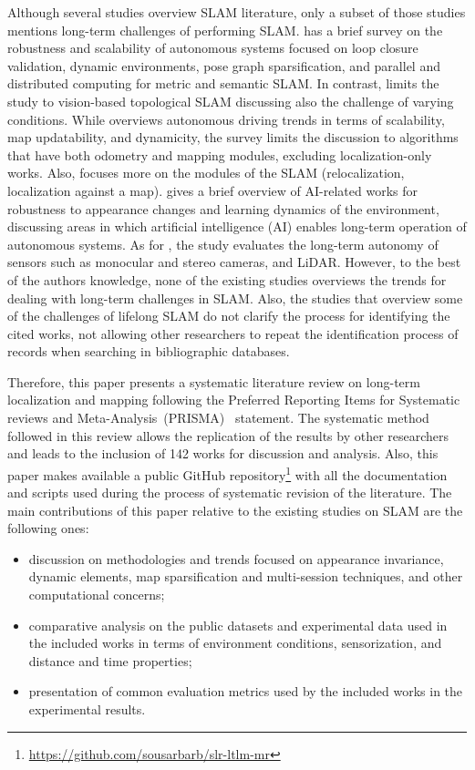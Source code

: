 Although several studies overview SLAM literature, only a subset of those studies mentions long-term challenges of performing SLAM.
\cite{purpose:study:cadena:2016} has a brief survey on the robustness and scalability of autonomous systems focused on loop closure validation, dynamic environments, pose graph sparsification, and parallel and distributed computing for metric and semantic SLAM.
In contrast, \cite{purpose:study:lowry:2016} limits the study to vision-based topological SLAM discussing also the challenge of varying conditions.
While \cite{purpose:study:bresson:2017} overviews autonomous driving trends in terms of scalability, map updatability, and dynamicity, the survey limits the discussion to algorithms that have both odometry and mapping modules, excluding localization-only works. Also, \cite{purpose:study:bresson:2017} focuses more on the modules of the SLAM (relocalization, localization against a map).
\cite{purpose:study:kunze:2018} gives a brief overview of AI-related works for robustness to appearance changes and learning dynamics of the environment, discussing areas in which artificial intelligence (AI) enables long-term operation of autonomous systems.
As for \cite{purpose:study:zaffar:2018}, the study evaluates the long-term autonomy of sensors such as monocular and stereo cameras, and LiDAR.
However, to the best of the authors knowledge, none of the existing studies overviews the trends for dealing with long-term challenges in SLAM. Also, the studies that overview some of the challenges of lifelong SLAM do not clarify the process for identifying the cited works, not allowing other researchers to repeat the identification process of records when searching in bibliographic databases.

Therefore, this paper presents a systematic literature review on long-term localization and mapping following the Preferred Reporting Items for Systematic reviews and Meta-Analysis~(PRISMA)~\parencite{methodology:prisma} statement.
The systematic method followed in this review allows the replication of the results by other researchers and leads to the inclusion of 142 works for discussion and analysis.
Also, this paper makes available a public GitHub repository\footnote{\url{https://github.com/sousarbarb/slr-ltlm-mr}} with all the documentation and scripts used during the process of systematic revision of the literature.
The main contributions of this paper relative to the existing studies on SLAM are the following ones:

\begin{itemize}[nosep]
\item discussion on methodologies and trends focused on appearance invariance, dynamic elements, map sparsification and multi-session techniques, and other computational concerns;
\item comparative analysis on the public datasets and experimental data used in the included works in terms of environment conditions, sensorization, and distance and time properties;
\item presentation of common evaluation metrics used by the included works in the experimental results.
\end{itemize}

